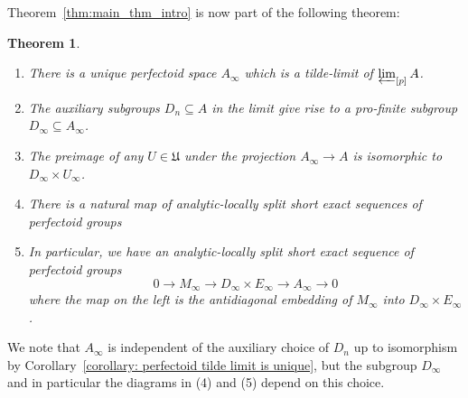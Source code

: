 \documentclass[10pt,oneside]{amsart}
\newtheorem{theorem}{Theorem}[section]
\theoremstyle{definition}
\begin{document}
Theorem~\ref{thm:main_thm_intro} is now part of the following theorem:	
	\begin{theorem}\label{tilde-limit of tilde-limits of partial towers is tilde-limit of whole tower}
		\begin{enumerate}
		\item There is a unique perfectoid space  $A_\infty$ which is a tilde-limit of $\varprojlim_{[p]}A$.
		\item The auxiliary subgroups $D_n\subseteq A$ in the limit give rise to a pro-finite subgroup $D_\infty \subseteq A_\infty$. 
		\item The preimage of any $U\in \mathfrak U$ under the projection $A_\infty \rightarrow A$ is isomorphic to $D_\infty \times U_\infty$. 
		
		\item 	There is a natural map of analytic-locally split short exact sequences of perfectoid groups		
		\begin{center}
		\end{center}
		\item 
		In particular, we have an analytic-locally split short exact sequence of perfectoid groups
		\[0\rightarrow M_\infty\rightarrow D_\infty \times E_\infty \rightarrow A_\infty\rightarrow 0\]
		where the map on the left is the antidiagonal embedding of $M_\infty$ into $D_\infty\times E_\infty$.
		\end{enumerate}
	\end{theorem}
	We note that $A_\infty$ is independent of the auxiliary choice of $D_n$ up to isomorphism by Corollary~\ref{corollary: perfectoid tilde limit is unique}, but the subgroup $D_\infty$ and in particular the diagrams in (4) and (5) depend on this choice.
\end{document}
